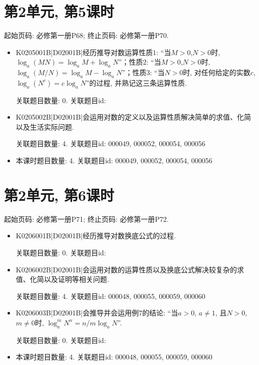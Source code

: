 \section*{第2单元, 第5课时}
起始页码: 必修第一册P68; 终止页码: 必修第一册P70.
\begin{itemize}
\item K0205001B|D02001B|经历推导对数运算性质$1$: ``当$M>0$,$N>0$时, $\log_a(MN)=\log_aM+\log_aN$''；性质$2$: ``当$M>0$,$N>0$时, $\log_a(M/N)=\log_aM-\log_aN$''；性质$3$: ``当$N>0$时, 对任何给定的实数$c$, $\log_a(N^{c})=c\log_aN$''的过程, 并熟记这三条运算性质.

关联题目数量: 0. 关联题目id: 

\item K0205002B|D02001B|会运用对数的定义以及运算性质解决简单的求值、化简以及生活实际问题.

关联题目数量: 4. 关联题目id: 000049, 000052, 000054, 000056

\item 本课时题目数量: 4. 关联题目id: 000049, 000052, 000054, 000056

\end{itemize}

\section*{第2单元, 第6课时}
起始页码: 必修第一册P71; 终止页码: 必修第一册P72.
\begin{itemize}
\item K0206001B|D02001B|经历推导对数换底公式的过程.

关联题目数量: 0. 关联题目id: 

\item K0206002B|D02001B|会运用对数的运算性质以及换底公式解决较复杂的求值、化简以及证明等相关问题.

关联题目数量: 4. 关联题目id: 000048, 000055, 000059, 000060

\item K0206003B|D02001B|会推导并会运用例7的结论: ``当$a>0$, $a\neq1$, 且$N>0$, $m\neq0$时, $\log_a^{m}N^{n}=n/m\log_aN$''.

关联题目数量: 0. 关联题目id: 

\item 本课时题目数量: 4. 关联题目id: 000048, 000055, 000059, 000060

\end{itemize}


